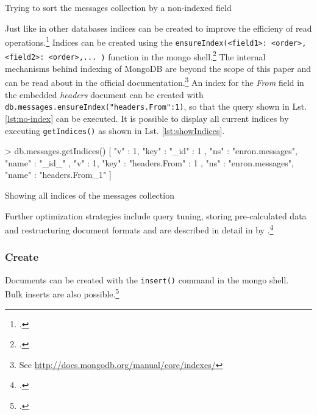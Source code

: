 \begin{listing}
    \caption{Trying to sort the messages collection by a non-indexed field}
    \label{lst:no-index}
\end{listing}

Just like in other databases indices can be created to improve the efficieny of
read operations.\footcite[Cf.][152 et sq.]{Redmond_2012} Indices can be created
using the \texttt{ensureIndex({<field1>: <order>, <field2>: <order>,... })}
function in the mongo shell.\footcite[Cf.][12]{mongo_crud_manual} 
The internal mechanisms behind indexing of MongoDB are beyond the scope of this
paper and can be read about in the official documentation.\footnote{See
\url{http://docs.mongodb.org/manual/core/indexes/}} An index for the
\textit{From} field in the embedded \textit{headers} document can be created
with \texttt{db.messages.ensureIndex({"headers.From":1})}, so that the query
shown in Lst. \ref{lst:no-index} can be executed. It is possible to display all
current indices by executing \texttt{getIndices()} as shown in Lst.
\ref{lst:showIndices}.

\begin{listing}
    \begin{javascriptcode}
> db.messages.getIndices()
[   {
        "v" : 1,
        "key" : { "_id" : 1 },
        "ns" : "enron.messages",
        "name" : "_id_"
    },
    {
        "v" : 1,
        "key" : { "headers.From" : 1 },
        "ns" : "enron.messages",
        "name" : "headers.From_1"
    } ]
    \end{javascriptcode}
    \caption{Showing all indices of the messages collection}
    \label{lst:showIndices}
\end{listing}

Further optimization strategies include query tuning, storing pre-calculated
data and restructuring document formats and are described in detail in
 by
\citeauthor{Chodorow_2011_tips}.\footcite[Cf.][]{Chodorow_2011_tips}

\FloatBarrier
\subsubsection{Create}
Documents can be created with the \texttt{insert()} command in the mongo
shell.\\
Bulk inserts are also possible.\footcite[Cf.][p. 53 et sqq.]{mongo_crud_manual}

